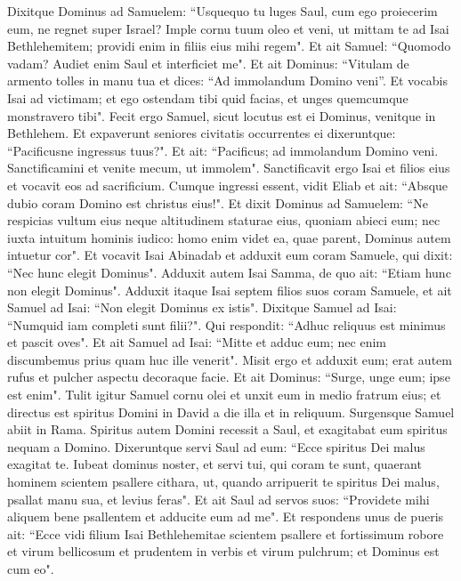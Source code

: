 \begin{biblechapter}  
\verse Dixitque Dominus ad Samuelem: “Usquequo tu luges Saul, cum ego proiecerim eum, ne regnet super Israel? Imple cornu tuum oleo et veni, ut mittam te ad Isai Bethlehemitem; providi enim in filiis eius mihi regem". 
\verse Et ait Samuel: “Quomodo vadam? Audiet enim Saul et interficiet me". Et ait Dominus: “Vitulam de armento tolles in manu tua et dices: “Ad immolandum Domino veni”.  
\verse Et vocabis Isai ad victimam; et ego ostendam tibi quid facias, et unges quemcumque monstravero tibi". 
\verse Fecit ergo Samuel, sicut locutus est ei Dominus, venitque in Bethlehem. Et expaverunt seniores civitatis occurrentes ei dixeruntque: “Pacificusne ingressus tuus?". 
\verse Et ait: “Pacificus; ad immolandum Domino veni. Sanctificamini et venite mecum, ut immolem". Sanctificavit ergo Isai et filios eius et vocavit eos ad sacrificium. 
\verse Cumque ingressi essent, vidit Eliab et ait: “Absque dubio coram Domino est christus eius!". 
\verse Et dixit Dominus ad Samuelem: “Ne respicias vultum eius neque altitudinem staturae eius, quoniam abieci eum; nec iuxta intuitum hominis iudico: homo enim videt ea, quae parent, Dominus autem intuetur cor". 
\verse Et vocavit Isai Abinadab et adduxit eum coram Samuele, qui dixit: “Nec hunc elegit Dominus". 
\verse Adduxit autem Isai Samma, de quo ait: “Etiam hunc non elegit Dominus". 
\verse Adduxit itaque Isai septem filios suos coram Samuele, et ait Samuel ad Isai: “Non elegit Dominus ex istis". 
\verse Dixitque Samuel ad Isai: “Numquid iam completi sunt filii?". Qui respondit: “Adhuc reliquus est minimus et pascit oves". Et ait Samuel ad Isai: “Mitte et adduc eum; nec enim discumbemus prius quam huc ille venerit". 
\verse Misit ergo et adduxit eum; erat autem rufus et pulcher aspectu decoraque facie. Et ait Dominus: “Surge, unge eum; ipse est enim". 
\verse Tulit igitur Samuel cornu olei et unxit eum in medio fratrum eius; et directus est spiritus Domini in David a die illa et in reliquum. Surgensque Samuel abiit in Rama. 
\verse Spiritus autem Domini recessit a Saul, et exagitabat eum spiritus nequam a Domino. 
\verse Dixeruntque servi Saul ad eum: “Ecce spiritus Dei malus exagitat te. 
\verse Iubeat dominus noster, et servi tui, qui coram te sunt, quaerant hominem scientem psallere cithara, ut, quando arripuerit te spiritus Dei malus, psallat manu sua, et levius feras". 
\verse Et ait Saul ad servos suos: “Providete mihi aliquem bene psallentem et adducite eum ad me". 
\verse Et respondens unus de pueris ait: “Ecce vidi filium Isai Bethlehemitae scientem psallere et fortissimum robore et virum bellicosum et prudentem in verbis et virum pulchrum; et Dominus est cum eo". 

\end{biblechapter}
